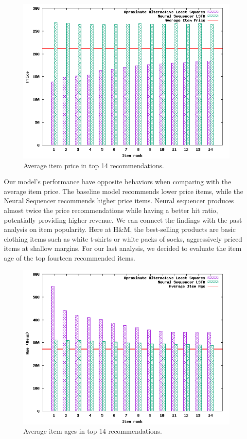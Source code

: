 \documentclass{tex_files/kththesis}
\begin{document}
\begin{figure}[H]
    \centering
    \includegraphics[scale=0.75]{charts/price.png}
    \caption{Average item price in top 14 recommendations.}
\end{figure}

Our model's performance have opposite behaviors when comparing with the average item price. The baseline model recommends lower price items, while the Neural Sequencer recommends higher price items. Neural sequencer produces almost twice the price recommendations while having a better hit ratio, potentially providing higher revenue. We can connect the findings with the past analysis on item popularity. Here at H\&M, the best-selling products are basic clothing items such as white t-shirts or white packs of socks, aggressively priced items at shallow margins. For our last analysis, we decided to evaluate the item age of the top fourteen recommended items.

\begin{figure}[H]
    \centering
    \includegraphics[scale=0.75]{charts/ages.png}
    \caption{Average item ages in top 14 recommendations.}
\end{figure}
\end{document}

